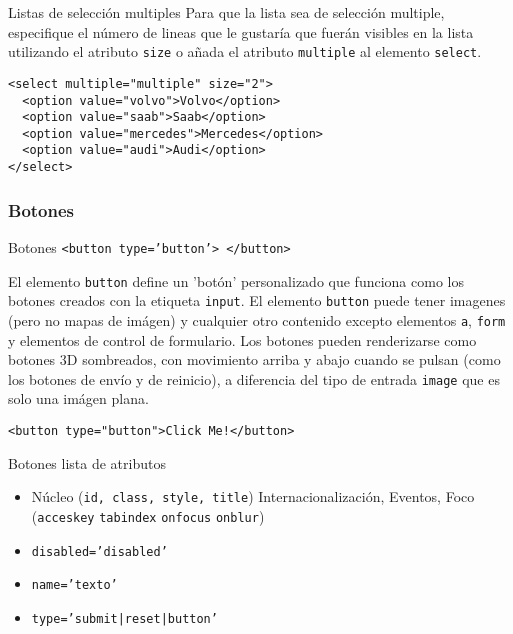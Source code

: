 \documentclass{beamer}
\begin{document}
\begin{frame}[fragile]{Listas de selección multiples} %
    Para que la lista sea de selección multiple, especifique el número de
    lineas que le gustaría que fuerán visibles en la lista utilizando el
    atributo \texttt{size} o añada el atributo \texttt{multiple} al elemento
    \texttt{select}. 

    \begin{lstlisting}
<select multiple="multiple" size="2">
  <option value="volvo">Volvo</option>
  <option value="saab">Saab</option>
  <option value="mercedes">Mercedes</option>
  <option value="audi">Audi</option>
</select>
    \end{lstlisting}

\end{frame}

\subsubsection{Botones}

\begin{frame}[fragile]{Botones \texttt{<button type='button'> </button>}} %
\footnotesize{
    El elemento \texttt{button} define un 'botón' personalizado que funciona
    como los botones creados con la etiqueta \texttt{input}. El elemento
    \texttt{button} puede tener imagenes (pero no mapas de imágen) y cualquier
    otro contenido excepto elementos \texttt{a}, \texttt{form} y elementos de
    control de formulario. Los botones pueden renderizarse como botones 3D
    sombreados, con movimiento arriba y abajo cuando se pulsan (como los
    botones de envío y de reinicio), a diferencia del tipo de entrada
    \texttt{image} que es solo una imágen plana. 

    \begin{lstlisting}
<button type="button">Click Me!</button>
    \end{lstlisting}

}
\end{frame}

\begin{frame}{Botones lista de atributos} %
    \begin{itemize}
        \item Núcleo (\texttt{id, class, style, title}) Internacionalización,
        Eventos, Foco (\texttt{acceskey} \texttt{tabindex} \texttt{onfocus}
        \texttt{onblur})
        \item \texttt{disabled='disabled'}
        \item \texttt{name='texto'}
        \item \texttt{type='submit|reset|button'}

    \end{itemize}
\end{frame}
\end{document}
